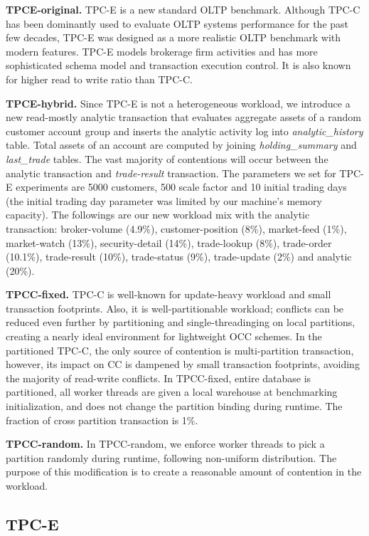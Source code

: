 \textbf{TPCE-original.}
TPC-E is a new standard OLTP benchmark. Although TPC-C has been dominantly used to evaluate OLTP systems performance for the past few decades, TPC-E was designed as a more realistic OLTP benchmark with modern features. TPC-E models brokerage firm activities and has more sophisticated schema model and transaction execution control\cite{TPCE}. It is also known for higher read to write ratio than TPC-C.


\textbf{TPCE-hybrid.}
Since TPC-E is not a heterogeneous workload, we introduce a new read-mostly analytic transaction that evaluates aggregate assets of a random customer account group and inserts the analytic activity log into \textit{analytic\_history} table. Total assets of an account are computed by joining \textit{holding\_summary} and \textit{last\_trade} tables. The vast majority of contentions will occur between the analytic transaction and \textit{trade-result} transaction. The parameters we set for TPC-E experiments are 5000 customers, 500 scale factor and 10 initial trading days (the initial trading day parameter was limited by our machine's memory capacity). The followings are our new workload mix with the analytic transaction: broker-volume (4.9\%), customer-position (8\%), market-feed (1\%), market-watch (13\%), security-detail (14\%), trade-lookup (8\%), trade-order (10.1\%), trade-result (10\%), trade-status (9\%), trade-update (2\%) and analytic (20\%). 


\textbf{TPCC-fixed.}
TPC-C is well-known for update-heavy workload and small transaction footprints. Also, it is well-partitionable workload; conflicts can be reduced even further by partitioning and single-threadinging on local partitions, creating a nearly ideal environment for lightweight OCC schemes. In the partitioned TPC-C, the only source of contention is multi-partition transaction, however, its impact on CC is dampened by small transaction footprints, avoiding the majority of read-write conflicts. In TPCC-fixed, entire database is partitioned, all worker threads are given a local warehouse at benchmarking initialization, and does not change the partition binding during runtime. The fraction of cross partition transaction is 1\%. 


\textbf{TPCC-random.}
In TPCC-random, we enforce worker threads to pick a partition randomly during runtime, following non-uniform distribution. The purpose of this modification is to create a reasonable amount of contention in the workload.  

\subsection{TPC-E}


